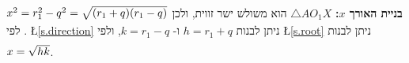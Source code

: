 \textbf{%
בניית האורך
$x$:}
$\triangle AO_1X$
הוא משולש ישר זווית, ולכן
$\rule[-5pt]{0pt}{30pt}x^2=r_1^2-q^2 =\sqrt{(r_1+q)(r_1-q)}$.
לפי
\L{\ref{s.direction}}
ניתן לבנות
$h =r_1+ q$
ו-%
$k= r_1 - q$,
ולפי
\L{\ref{s.root}}
ניתן לבנות
$\rule[-5pt]{0pt}{20pt}x= \sqrt{hk}$. 


